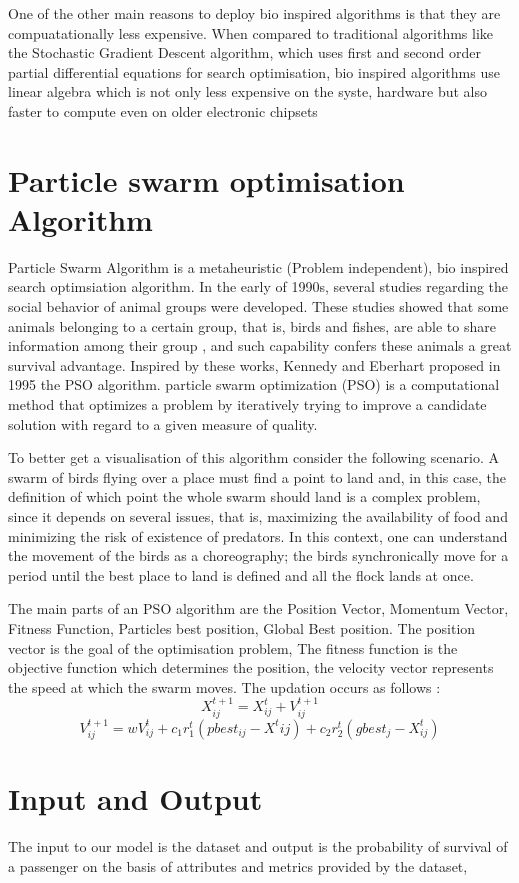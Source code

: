 \documentclass{article}
\newcommand{\nd}{\noindent}
\begin{document}
\nd One of the other main reasons to deploy bio inspired algorithms is that they are compuatationally less expensive. When compared to traditional algorithms like the Stochastic Gradient Descent algorithm, which uses first and second order partial differential equations for search optimisation, bio inspired algorithms use linear algebra which is not only less expensive on the syste, hardware but also faster to compute even on older electronic chipsets

\section{Particle swarm optimisation Algorithm} 
Particle Swarm Algorithm is a metaheuristic (Problem independent), bio inspired search optimsiation algorithm. In the early of 1990s, several studies regarding the social behavior of animal groups were developed. These studies showed that some animals belonging to a certain group, that is, birds and fishes, are able to share information among their group , and such capability confers these animals a great survival advantage. Inspired by these works, Kennedy and Eberhart proposed in 1995 the PSO algorithm. particle swarm optimization (PSO) is a computational method that optimizes a problem by iteratively trying to improve a candidate solution with regard to a given measure of quality.

\nd To better get a visualisation of this algorithm consider the following scenario. A swarm of birds flying over a place must find a point to land and, in this case, the definition of which point the whole swarm should land is a complex problem, since it depends on several issues, that is, maximizing the availability of food and minimizing the risk of existence of predators. In this context, one can understand the movement of the birds as a choreography; the birds synchronically move for a period until the best place to land is defined and all the flock lands at once.

\nd The main parts of an PSO algorithm are the Position Vector, Momentum Vector, Fitness Function, Particles best position, Global Best position. The position vector is the goal of the optimisation problem, The fitness function is the objective function which determines the position, the velocity vector represents the speed at which the swarm moves. The updation occurs as follows : 
\begin{equation}
X^{t+1}_{ij}= X^{t}_{ij}+ V^{t+1}_{ij} 
\end{equation} 
\begin{equation}
V^{t+1}_{ij}= wV^{t}_{ij}+c_1 r^{t}_{1} (pbest_{ij}-X^{t}{ij})+c_2 r^{t}_{2}(gbest_j - X^{t}_{ij})
\end{equation} 

\section{Input and Output} 
The input to our model is the dataset and output is the probability of survival of a passenger on the basis of attributes and metrics provided by the dataset, 
\end{document}
